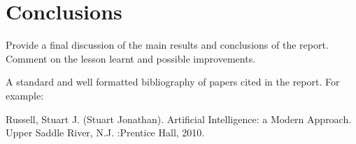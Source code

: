 \documentclass{svproc}
\begin{document}
\section{Conclusions}
Provide a final discussion of the main results and conclusions of the report. Comment on the lesson learnt and possible improvements.


A standard and well formatted bibliography of papers cited in the report. For example:

\begin{thebibliography}{6}
%

Russell, Stuart J. (Stuart Jonathan). Artificial Intelligence: a Modern Approach. Upper Saddle River, N.J.       :Prentice Hall, 2010.


\end{thebibliography}
\end{document}
